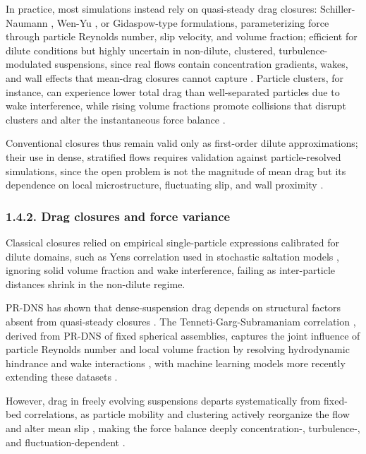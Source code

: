 In practice, most simulations instead rely on quasi-steady drag closures: Schiller-Naumann \cite{PEND_SchillerNaumann1935}, Wen-Yu \cite{PEND_WenYu1966}, or Gidaspow-type formulations, parameterizing force through particle Reynolds number, slip velocity, and volume fraction; efficient for dilute conditions but highly uncertain in non-dilute, clustered, turbulence-modulated suspensions, since real flows contain concentration gradients, wakes, and wall effects that mean-drag closures cannot capture \cite{PEND_Gualtieri2014,willen__2019}. Particle clusters, for instance, can experience lower total drag than well-separated particles due to wake interference, while rising volume fractions promote collisions that disrupt clusters and alter the instantaneous force balance \cite{chouippe__2023,willen__2019}.

Conventional closures thus remain valid only as first-order dilute approximations; their use in dense, stratified flows requires validation against particle-resolved simulations, since the open problem is not the magnitude of mean drag but its dependence on local microstructure, fluctuating slip, and wall proximity \cite{capecelatro__2013,osnes__2025}.

\subsubsection{1.4.2. Drag closures and force variance}

Classical closures relied on empirical single-particle expressions calibrated for dilute domains, such as Yen\textquotesingle s \cite{PEND_Yen1992} correlation used in stochastic saltation models \cite{PEND_Nio1994,PEND_Nio1996}, ignoring solid volume fraction and wake interference, failing as inter-particle distances shrink in the non-dilute regime.

PR-DNS has shown that dense-suspension drag depends on structural factors absent from quasi-steady closures \cite{brandt__2022,chouippe__2023}. The Tenneti-Garg-Subramaniam correlation \cite{tenneti__2011}, derived from PR-DNS of fixed spherical assemblies, captures the joint influence of particle Reynolds number and local volume fraction by resolving hydrodynamic hindrance and wake interactions \cite{capecelatro__2018,guta__2024}, with machine learning models more recently extending these datasets \cite{PEND_He2019,PEND_Jiang2021}.

However, drag in freely evolving suspensions departs systematically from fixed-bed correlations, as particle mobility and clustering actively reorganize the flow and alter mean slip \cite{tavanashad__2021,PEND_Doren2023}, making the force balance deeply concentration-, turbulence-, and fluctuation-dependent \cite{brandt__2022,zhou__2020}.

